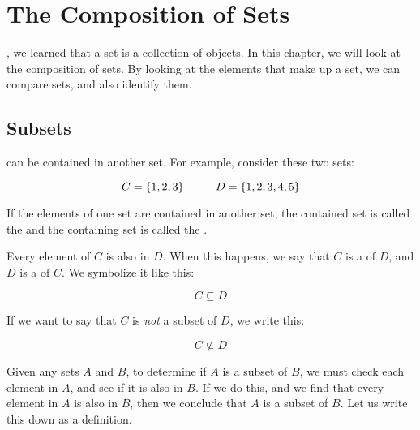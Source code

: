 \documentclass[../../../main.tex]{subfiles}
\begin{document}
\chapter{The Composition of Sets}
\label{ch:the-composition-of-sets}

, we learned that a set is a collection of objects. In this chapter, we will look at the composition of sets. By looking at the elements that make up a set, we can compare sets, and also identify them.


\section{Subsets}

 can be contained in another set. For example, consider these two sets:

\begin{equation*}
  C = \{ 1, 2, 3 \} \hskip 1cm D = \{ 1, 2, 3, 4, 5 \}
\end{equation*}

\begin{terminology}
  If the elements of one set are contained in another set, the contained set is called the  and the containing set is called the .
\end{terminology}

Every element of $C$ is also in $D$. When this happens, we say that $C$ is a  of $D$, and $D$ is a  of $C$. We symbolize it like this:

\begin{equation*}
  C \subseteq D
\end{equation*}

If we want to say that $C$ is \emph{not} a subset of $D$, we write this:

\begin{equation*}
  C \not \subseteq D
\end{equation*}

Given any sets $A$ and $B$, to determine if $A$ is a subset of $B$, we must check each element in $A$, and see if it is also in $B$. If we do this, and we find that every element in $A$ is also in $B$, then we conclude that $A$ is a subset of $B$. Let us write this down as a definition.
\end{document}
